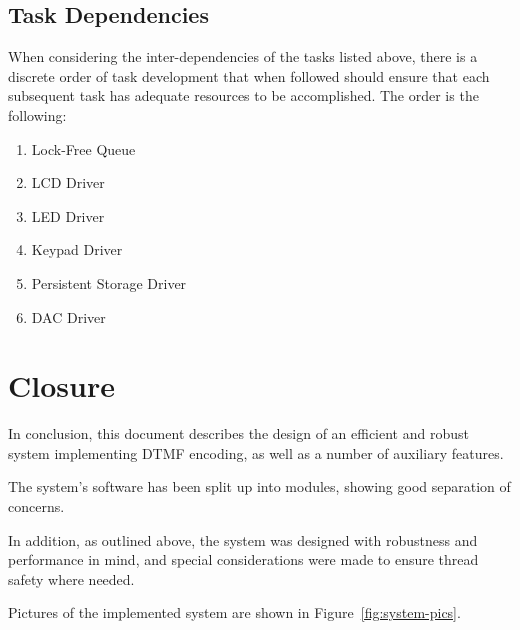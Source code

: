 \documentclass[11pt,a4paper,twocolumn]{scrartcl}
\begin{document}
\subsection{Task Dependencies}
When considering the inter-dependencies of the tasks listed above, there is a discrete order of task development that when followed should ensure that each subsequent task has adequate resources to be accomplished. The order is the following:
\begin{enumerate}
    \item Lock-Free Queue
    \item LCD Driver
   \item LED Driver
   \item Keypad Driver
   \item Persistent Storage Driver
   \item DAC Driver
\end{enumerate}

\section{Closure}

In conclusion, this document describes the design of an efficient and robust system implementing DTMF encoding, as well as a number of auxiliary features. 

The system's software has been split up into modules, showing good separation of concerns. 

In addition, as outlined above, the system was designed with robustness and performance in mind, and special considerations were made to ensure thread safety where needed.

Pictures of the implemented system are shown in Figure~\ref{fig:system-pics}.
\end{document}
